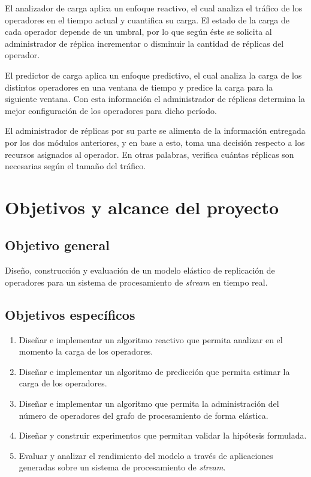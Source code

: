 El analizador de carga aplica un enfoque reactivo, el cual analiza el tr\'afico de los operadores en el tiempo actual y cuantifica su carga. El estado de la carga de cada operador depende de un umbral, por lo que seg\'un \'este se solicita al administrador de r\'eplica incrementar o disminuir la cantidad de r\'eplicas del operador.

El predictor de carga aplica un enfoque predictivo, el cual analiza la carga de los distintos operadores en una ventana de tiempo y predice la carga para la siguiente ventana. Con esta informaci\'on el administrador de r\'eplicas determina la mejor configuraci\'on de los operadores para dicho per\'iodo.

El administrador de r\'eplicas por su parte se alimenta de la informaci\'on entregada por los dos m\'odulos anteriores, y en base a esto, toma una decisi\'on respecto a los recursos asignados al operador. En otras palabras, verifica cu\'antas r\'eplicas son necesarias seg\'un el tama\~no del tr\'afico.

\section{Objetivos y alcance del proyecto}
\label{intro:objetivos}

\subsection{Objetivo general}
	Dise\~no, construcci\'on y evaluaci\'on de un modelo el\'astico de replicaci\'on de operadores para un sistema de procesamiento de \textit{stream} en tiempo real.

\subsection{Objetivos espec\'ificos}
\begin{enumerate}
	\item Dise\~nar e implementar un algoritmo reactivo que permita analizar en el momento la carga de los operadores.
	\item Dise\~nar e implementar un algoritmo de predicci\'on que permita estimar la carga de los operadores.
	\item Dise\~nar e implementar un algoritmo que permita la administraci\'on del n\'umero de operadores del grafo de procesamiento de forma el\'astica.
	\item Dise\~nar y construir experimentos que permitan validar la hip\'otesis formulada.
	\item Evaluar y analizar el rendimiento del modelo a trav\'es de aplicaciones generadas sobre un sistema de procesamiento de \textit{stream}.
\end{enumerate}

